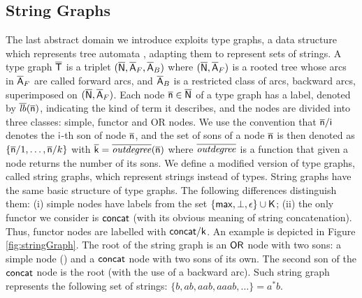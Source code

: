 \documentclass[orivec]{llncs}
\begin{document}
 
 
 
\subsection{String Graphs}
 
 
The last abstract domain we introduce exploits type graphs, a data structure which represents tree automata \cite{JAN92}, adapting them to represent sets of strings. A type graph $\mathsf{\overline{T}}$ is a triplet $(\mathsf{\overline{N}}, \mathsf{\overline{A}}_F, \mathsf{\overline{A}}_B)$ where $(\mathsf{\overline{N}}, \mathsf{\overline{A}}_F)$ is a rooted tree whose arcs in $\mathsf{\overline{A}}_F$ are called forward arcs, and $\mathsf{\overline{A}}_B$ is a restricted class of arcs, backward arcs, superimposed on $(\mathsf{\overline{N}}, \mathsf{\overline{A}}_F)$. Each node $\mathsf{\overline{n}} \in \mathsf{\overline{N}}$ of a type graph has a label, denoted by $\overline{\mathit{lb}}(\mathsf{\overline{n}})$, indicating the kind of term it describes, and the nodes are divided into three classes: simple, functor and OR nodes. We use the convention that $\mathsf{\overline{n}}/\mathsf{i}$ denotes the $\mathsf{i}$-th son of node $\mathsf{\overline{n}}$, and the set of sons of a node $\mathsf{\overline{n}}$ is then denoted as $\{\mathsf{\overline{n}}/1, \dots, \mathsf{\overline{n}}/k\}$ with $\mathsf{\overline{k}} = \overline{\mathit{outdegree}}(\mathsf{\overline{n}})$ where $\overline{\mathit{outdegree}}$ is a function that given a node returns the number of its sons. We define a modified version of type graphs, called string graphs, which represent strings instead of types. String graphs have the same basic structure of type graphs. The following differences distinguish them: (i) simple nodes have labels from the set $\{ \mathsf{max}, \bot, \epsilon \} \cup \mathsf{K}$; (ii) the only functor we consider is $\mathsf{concat}$ (with its obvious meaning of string concatenation). Thus, functor nodes are labelled with $\mathsf{concat}/\mathsf{k}$.
An example is depicted in Figure \ref{fig:stringGraph}. The root of the string graph is an $\mathsf{OR}$ node with two sons: a simple node () and a $\mathsf{concat}$ node with two sons of its own. The second son of the $\mathsf{concat}$ node is the root (with the use of a backward arc). Such string graph represents the following set of strings: $\{ b, ab, aab, aaab, \dots \} = a^*b$.
\end{document}
